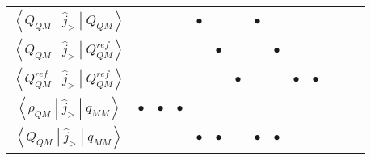 \documentclass{article}
\begin{document}
\begin{table}[tbp]
\begin{threeparttable}
\begin{tabular}{cccccccccccccc}
$\left< Q_{QM} \middle| \hat{j}_ {>} \middle| Q_{QM} \right>$             &                     &                        &                                     & $\bullet$                                                                                                                &                        &                                     & $\bullet$                                         &                        &                    &                   &                      &                   &                  \\
$\left< Q_{QM} \middle| \hat{j}_ {>} \middle| Q_{QM}^{ref} \right>$       &                     &                        &                                     &                                                                                                                          & $\bullet$              &                                     &                                                   & $\bullet$              &                    &                   &                      &                   &                  \\
$\left< Q_{QM}^{ref} \middle| \hat{j}_ {>} \middle| Q_{QM}^{ref} \right>$ &                     &                        &                                     &                                                                                                                          &                        & $\bullet$                           &                                                   &                        & $\bullet$          & $\bullet$         &                      &                   &                  \\
\rowcolor{Gray}
$\left< \rho_{QM} \middle| \hat{j}_{>} \middle| q_{MM} \right>$           & $\bullet$           & $\bullet$              & $\bullet$                           &                                                                                                                          &                        &                                     &                                                   &                        &                    &                   &                      &                   &                  \\
\rowcolor{Gray}
$\left< Q_{QM} \middle| \hat{j}_{>} \middle| q_{MM} \right>$              &                     &                        &                                     & $\bullet$                                                                                                                & $\bullet$              &                                     & $\bullet$                                         & $\bullet$              &                    &                   &                      &                   &                  \\

\end{tabular}
\end{threeparttable}
\end{table}
\end{document}
